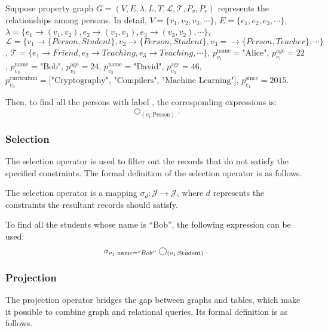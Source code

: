 \begin{example}
    Suppose property graph $G = (V, E, \lambda, L, T, \mathcal{L}, \mathcal{T}, P_v, P_e)$ represents the relationships among persons.
    In detail, $V = \{v_1, v_2, v_3, \cdots\}$, $E = \{e_1, e_2, e_3, \cdots\}$, $\lambda = \{e_1 \rightarrow (v_1, v_2), e_2 \rightarrow (v_3, v_1), e_3 \rightarrow (v_3, v_2), \cdots\}$, $\mathcal{L} = \{v_1 \rightarrow \{Person, Student\}, v_2 \rightarrow \{Person, Student\}, v_3 = \rightarrow \{Person, Teacher\}, \cdots\}$, $\mathcal{T} = \{e_1 \rightarrow Friend, e_2 \rightarrow Teaching, e_3 \rightarrow Teaching, \cdots\}$, $p_{v_1}^{\text{name}} = \text{"Alice"}$, $p_{v_1}^{\text{age}} = \text{22}$, $p_{v_2}^{\text{name}} = \text{"Bob"}$, $p_{v_2}^{\text{age}} = \text{24}$, $p_{v_3}^{\text{name}} = \text{"David"}$, $p_{v_3}^{\text{age}} = \text{46}$, $p_{v_3}^{\text{curriculum}} = [\text{"Cryptography"}$, $\text{"Compilers"}$, $\text{"Machine Learning"}]$, $p_{e_1}^{\text{since}} = \text{2015}$. 

    Then, to find all the persons with label , the corresponding expressions is:
    \begin{equation*}
        \bigcirc_{(v_1\text{:Person})}.
    \end{equation*}
\end{example}


\subsubsection{Selection}

The selection operator is used to filter out the records that do not satisfy the specified constraints.
The formal definition of the selection operator is as follows.

\begin{definition}
    The selection operator is a mapping $\sigma_d : \mathcal{J} \rightarrow \mathcal{J}$, where $d$ represents the constraints the resultant records should satisfy.
\end{definition}

\begin{example}
    To find all the students whose name is ``Bob'', the following expression can be used:
    \begin{equation*}
        \sigma_{v_1.\text{name} = ``Bob''}\bigcirc_{(v_1\text{:Student})}.
    \end{equation*}
\end{example}

\subsubsection{Projection}
The projection operator bridges the gap between graphs and tables, which make it possible to combine graph and relational queries.
Its formal definition is as follows.

